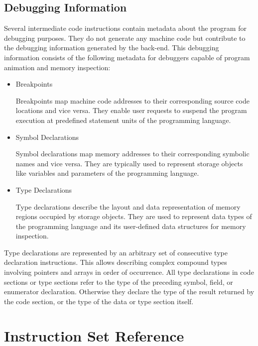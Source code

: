 \subsection{Debugging Information}\label{sec:cddebugging}

Several intermediate code instructions contain metadata about the program for debugging purposes.
They do not generate any machine code but contribute to the debugging information generated by the back-end.
This debugging information consists of the following metadata for debuggers capable of program animation and memory inspection:

\begin{itemize}

\item Breakpoints\nopagebreak

Breakpoints map machine code addresses to their corresponding source code locations and vice versa.
They enable user requests to suspend the program execution at predefined statement units of the programming language.

\item Symbol Declarations\nopagebreak

Symbol declarations map memory addresses to their corresponding symbolic names and vice versa.
They are typically used to represent storage objects like variables and parameters of the programming language.

\item Type Declarations\nopagebreak

Type declarations describe the layout and data representation of memory regions occupied by storage objects.
They are used to represent data types of the programming language and its user-defined data structures for memory inspection.

\end{itemize}

Type declarations are represented by an arbitrary set of consecutive type declaration instructions.
This allows describing complex compound types involving pointers and arrays in order of occurrence.
All type declarations in code sections or type sections refer to the type of the preceding symbol, field, or enumerator declaration.
Otherwise they declare the type of the result returned by the code section, or the type of the data or type section itself.
\seedebugging

\section{Instruction Set Reference}\label{sec:cdreference}

